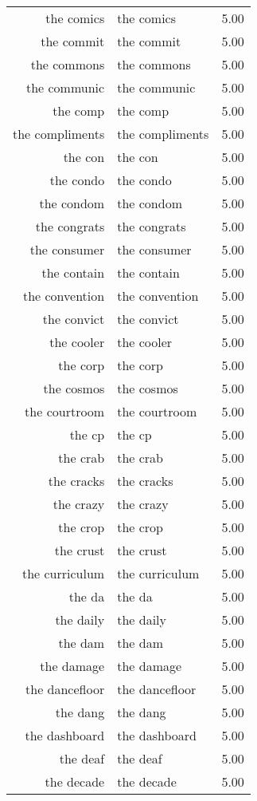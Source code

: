 \begin{table}[ht]
\begin{tabular}{rlr}
  the comics & the comics & 5.00 \\ 
  the commit & the commit & 5.00 \\ 
  the commons & the commons & 5.00 \\ 
  the communic & the communic & 5.00 \\ 
  the comp & the comp & 5.00 \\ 
  the compliments & the compliments & 5.00 \\ 
  the con & the con & 5.00 \\ 
  the condo & the condo & 5.00 \\ 
  the condom & the condom & 5.00 \\ 
  the congrats & the congrats & 5.00 \\ 
  the consumer & the consumer & 5.00 \\ 
  the contain & the contain & 5.00 \\ 
  the convention & the convention & 5.00 \\ 
  the convict & the convict & 5.00 \\ 
  the cooler & the cooler & 5.00 \\ 
  the corp & the corp & 5.00 \\ 
  the cosmos & the cosmos & 5.00 \\ 
  the courtroom & the courtroom & 5.00 \\ 
  the cp & the cp & 5.00 \\ 
  the crab & the crab & 5.00 \\ 
  the cracks & the cracks & 5.00 \\ 
  the crazy & the crazy & 5.00 \\ 
  the crop & the crop & 5.00 \\ 
  the crust & the crust & 5.00 \\ 
  the curriculum & the curriculum & 5.00 \\ 
  the da & the da & 5.00 \\ 
  the daily & the daily & 5.00 \\ 
  the dam & the dam & 5.00 \\ 
  the damage & the damage & 5.00 \\ 
  the dancefloor & the dancefloor & 5.00 \\ 
  the dang & the dang & 5.00 \\ 
  the dashboard & the dashboard & 5.00 \\ 
  the deaf & the deaf & 5.00 \\ 
  the decade & the decade & 5.00 \\ 

\end{tabular}
\end{table}

